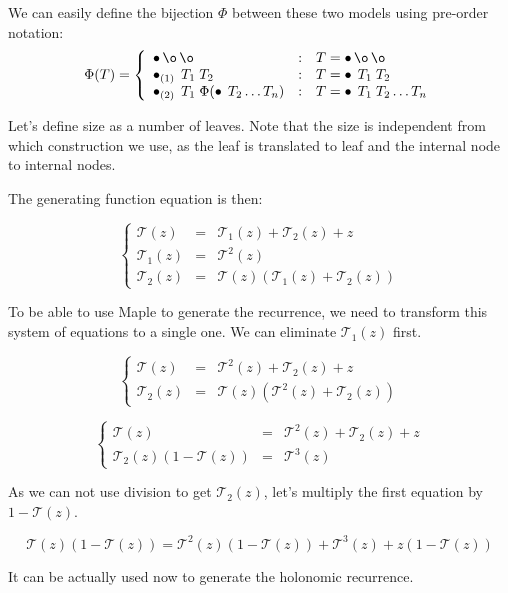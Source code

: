 \documentclass[final]{article}
\theoremstyle{definition}
\theoremstyle{remark}
\newcommand{\gf}[1]{\ensuremath{\mathcal{#1}}}
\newcommand{\weighted}[1]{\ensuremath{_{(#1)}}}
\DeclareMathOperator{\n}{\bullet}
\DeclareMathOperator{\no}{\o}
\begin{document}
We can easily define the bijection \(\Phi\) between these two models using pre-order notation:
\[\Phi(T) = \left\{\begin{array}{lcl}
            \n \no \no &:& T = \n \no \no \\
            \n\weighted{1}\; T_1\; T_2 &:& T = \n\; T_1\; T_2\\
            \n\weighted{2}\; T_1\; \Phi(\n\; T_2 \ldots T_n) &:& T = \n\; T_1\; T_2 \ldots T_n
\end{array}\right.\]

Let's define size as a number of leaves. Note that the size is independent from which construction we use, as the leaf is translated to leaf and the internal node to internal nodes.

The generating function equation is then:

\[\left\{\begin{array}{rcl}
            \gf{T}(z) &=& \gf{T}_1(z) + \gf{T}_2(z) + z\\
            \gf{T}_1(z) &=& \gf{T}^2(z)\\
            \gf{T}_2(z) &=& \gf{T}(z)(\gf{T}_1(z) + \gf{T}_2(z))
\end{array}\right.\]

To be able to use Maple to generate the recurrence, we need to transform this system of equations to a single one. We can eliminate \(\gf{T}_1(z)\) first.

\[\left\{\begin{array}{rcl}
            \gf{T}(z) &=& \gf{T}^2(z) + \gf{T}_2(z) + z\\
            \gf{T}_2(z) &=& \gf{T}(z)(\gf{T}^2(z) + \gf{T}_2(z))
\end{array}\right.\]

\[\left\{\begin{array}{rcl}
            \gf{T}(z) &=& \gf{T}^2(z) + \gf{T}_2(z) + z\\
            \gf{T}_2(z)(1 - \gf{T}(z)) &=& \gf{T}^3(z)
\end{array}\right.\]

As we can not use division to get \(\gf{T}_2(z)\), let's multiply the first equation by \(1 - \gf{T}(z)\).

\[\gf{T}(z)(1 - \gf{T}(z)) = \gf{T}^2(z)(1 - \gf{T}(z)) + \gf{T}^3(z) + z(1 - \gf{T}(z))\]

It can be actually used now to generate the holonomic recurrence.
\end{document}

